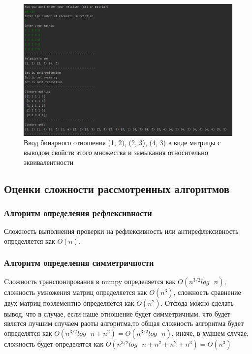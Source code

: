\documentclass[spec, och, labwork]{shiza}
\begin{document}
        \begin{figure}[H]
            \centering      %
            \includegraphics[width=1.\textwidth]{4}
            \caption{Ввод бинарного отношения {(1, 2), (2, 3), (4, 3)} в виде матрицы с выводом свойств этого множества и замыкания относительно эквивалентности}
            \label{fig:image1}
        \end{figure}

        \subsection{Оценки сложности рассмотренных алгоритмов}

        \subsubsection{Алгоритм определения рефлексивности}

            Сложность выполнения проверки на рефлексивность или антирефлексивность определяется как $O(n)$.

        \subsubsection{Алгоритм определения симметричности}

            Cложность транспонирования в numpy определяется как $O(n^{3/2}log \text{ } n)$, сложность умножения матриц 
            определяется как $O(n^3)$, сложность сравнение двух матриц поэлементно определяется как $O(n^2)$. 
            Отсюда можно сделать вывод, что в случае, если наше отношение будет симметричным,
            что будет являтся лучшим случаем раоты алгоритма,то общая сложность алгоритма будет определятся как 
            $O(n^{3/2}log \text{ } n + n^2) = O(n^{3/2}log \text{ } n)$,
            иначе, в худшем случае, сложность будет определятся как $O(n^{3/2}log \text{ } n + n^2 + n^2 + n^3) = O(n^3)$
\end{document}
